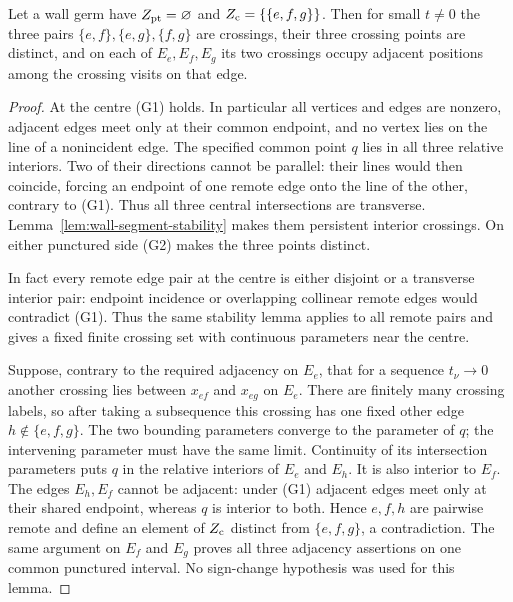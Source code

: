 \begin{lemma}\label{lem:triple-sides}\leanok
Let a wall germ have $Z_{\rm pt}=\varnothing$ and
$Z_{\rm c}=\{\{e,f,g\}\}$. Then for small $t\neq0$ the three pairs
$\{e,f\},\{e,g\},\{f,g\}$ are crossings, their three crossing points
are distinct, and on each of $E_e,E_f,E_g$ its two crossings occupy adjacent
positions among the crossing visits on that edge.

\end{lemma}
\begin{proof}\leanok{}
At the centre (G1) holds. In particular all vertices and edges are nonzero,
adjacent edges meet only at their common endpoint, and no vertex lies on the
line of a nonincident edge. The specified common point $q$ lies in all three
relative interiors. Two of their directions cannot be parallel: their lines
would then coincide, forcing an endpoint of one remote edge onto the line
of the other, contrary to (G1). Thus all three central intersections are
transverse. Lemma~\ref{lem:wall-segment-stability} makes them persistent
interior crossings. On either punctured side (G2) makes the three points
distinct.

In fact every remote edge pair at the centre is either disjoint or a transverse
interior pair: endpoint incidence or overlapping collinear remote edges would
contradict (G1). Thus the same stability lemma applies to all remote pairs and
gives a fixed finite crossing set with continuous parameters near the centre.

Suppose, contrary to the required adjacency on $E_e$, that for a sequence
$t_\nu\to0$ another crossing lies between $x_{ef}$ and $x_{eg}$ on $E_e$.
There are finitely many crossing labels, so after taking a subsequence this
crossing has one fixed other edge $h\notin\{e,f,g\}$. The two bounding
parameters converge to the parameter of $q$; the intervening parameter must
have the same limit. Continuity of its intersection parameters puts $q$ in
the relative interiors of $E_e$ and $E_h$. It is also interior to $E_f$.
The edges $E_h,E_f$ cannot be adjacent: under (G1) adjacent edges meet only
at their shared endpoint, whereas $q$ is interior to both. Hence $e,f,h$
are pairwise remote and define an element of $Z_{\rm c}$ distinct from
$\{e,f,g\}$, a contradiction. The same argument on $E_f$ and $E_g$ proves
all three adjacency assertions on one common punctured interval. No sign-change
hypothesis was used for this lemma.
\end{proof}

